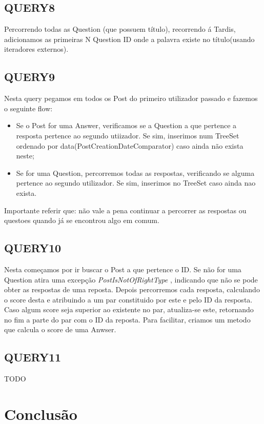 \documentclass[letterpaper, 10 pt, conference]{IEEEtran} %
\begin{document}
\subsection{QUERY8}

Percorrendo todas as Question (que possuem título), recorrendo á Tardis, adicionamos as primeiras N Question ID onde a palavra
existe no título(usando iteradores externos).

\subsection{QUERY9}

Nesta query pegamos em todos os Post do primeiro utilizador passado e fazemos o seguinte flow:
\begin{itemize}
    \item Se o Post for uma Answer, verificamos se a Question a que pertence a resposta pertence ao segundo utiizador. Se sim,
    inserimos num TreeSet ordenado por data(PostCreationDateComparator) caso ainda não exista neste;
    \item Se for uma Question, percorremos todas as respostas, verificando se alguma pertence ao segundo utilizador. Se sim, inserimos
    no TreeSet caso ainda nao exista.
\end{itemize}
    Importante referir que: não vale a pena continuar a percorrer as respostas ou questoes quando já se encontrou algo em comum.


\subsection{QUERY10}

Nesta começamos por ir buscar o Post a que pertence o ID. Se não for uma Question atira uma excepção \textit{PostIsNotOfRightType}
, indicando que não se pode obter as respostas de uma reposta.
Depois percorremos cada resposta, calculando o score desta e atribuindo a um par constituido por este e pelo ID da resposta.
Caso algum score seja superior ao existente no par, atualiza-se este, retornando no fim a parte do par com o ID da reposta.
Para facilitar, criamos um metodo que calcula o score de uma Anwser.

\subsection{QUERY11}

TODO

\section{Conclusão}
\end{document}
